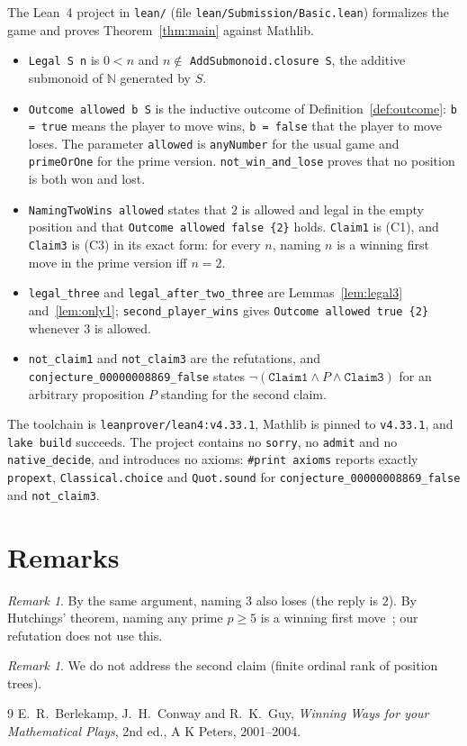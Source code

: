 \documentclass[11pt]{article}
\theoremstyle{plain}
\theoremstyle{definition}
\theoremstyle{remark}
\newtheorem{remark}[theorem]{Remark}
\begin{document}
\sloppy
The Lean~4 project in \texttt{lean/} (file \texttt{lean/Submission/Basic.lean})
formalizes the game and proves Theorem~\ref{thm:main} against Mathlib.
\begin{itemize}
  \item \texttt{Legal S n} is $0<n$ and $n\notin$ \texttt{AddSubmonoid.closure S},
    the additive submonoid of $\mathbb N$ generated by $S$.
  \item \texttt{Outcome allowed b S} is the inductive outcome of
    Definition~\ref{def:outcome}: \texttt{b = true} means the player to move wins,
    \texttt{b = false} that the player to move loses. The parameter
    \texttt{allowed} is \texttt{anyNumber} for the usual game and
    \texttt{primeOrOne} for the prime version. \texttt{not\_win\_and\_lose} proves
    that no position is both won and lost.
  \item \texttt{NamingTwoWins allowed} states that $2$ is allowed and legal in the
    empty position and that \texttt{Outcome allowed false \{2\}} holds.
    \texttt{Claim1} is (C1), and \texttt{Claim3} is (C3) in its exact form: for
    every $n$, naming $n$ is a winning first move in the prime version iff $n=2$.
  \item \texttt{legal\_three} and \texttt{legal\_after\_two\_three} are
    Lemmas~\ref{lem:legal3} and~\ref{lem:only1}; \texttt{second\_player\_wins} gives
    \texttt{Outcome allowed true \{2\}} whenever $3$ is allowed.
  \item \texttt{not\_claim1} and \texttt{not\_claim3} are the refutations, and
    \texttt{conjecture\_00000008869\_false} states
    $\lnot(\texttt{Claim1}\wedge P\wedge\texttt{Claim3})$ for an arbitrary
    proposition $P$ standing for the second claim.
\end{itemize}
The toolchain is \texttt{leanprover/lean4:v4.33.1}, Mathlib is pinned to
\texttt{v4.33.1}, and \texttt{lake build} succeeds. The project contains no
\texttt{sorry}, no \texttt{admit} and no \texttt{native\_decide}, and introduces no
axioms: \texttt{\#print axioms} reports exactly \texttt{propext},
\texttt{Classical.choice} and \texttt{Quot.sound} for
\texttt{conjecture\_00000008869\_false} and \texttt{not\_claim3}.

\fussy
\section{Remarks}

\begin{remark}
By the same argument, naming $3$ also loses (the reply is $2$). By Hutchings'
theorem, naming any prime $p\ge5$ is a winning first move~\cite{ww}; our refutation
does not use this.
\end{remark}

\begin{remark}
We do not address the second claim (finite ordinal rank of position trees).
\end{remark}

\begin{thebibliography}{9}
 E.~R.~Berlekamp, J.~H.~Conway and R.~K.~Guy, \emph{Winning Ways for
  your Mathematical Plays}, 2nd ed., A K Peters, 2001--2004.
\end{thebibliography}
\end{document}
